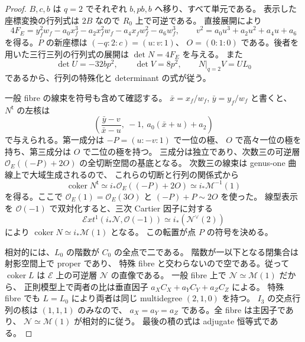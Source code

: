 \begin{proof}
$B,c,b$ は $q=2$ でそれぞれ $b,pb,b$ へ移り、すべて単元である。
表示した座標変換の行列式は $2B$ なので $R_0$ 上で可逆である。
直接展開により
\[
 4F_E=y_f^2w_f-a_0x_f^3-a_2x_f^2w_f-a_4x_fw_f^2-a_6w_f^3,
 \qquad v^2=a_0u^3+a_2u^2+a_4u+a_6
\]
を得る。$P$ の新座標は $(-q:2:c)=(u:v:1)$、
$O=(0:1:0)$ である。後者を用いた三行三列の行列式の展開は
$\det N=4F_E$ を与える。
また
\[
 \det U=-32bp^2,\qquad\det V=8p^2,\qquad
 N|_{q=2}V=UL_0
\]
であるから、行列の特殊化と determinant の式が従う。

一般 fibre の線束を符号も含めて確認する。
$\bar x=x_f/w_f$, $\bar y=y_f/w_f$ と書くと、
$N^{\mathsf t}$ の左核は
\[
 \left(\frac{\bar y-v}{\bar x-u},\ -1,\
              a_0(\bar x+u)+a_2\right)
\]
で与えられる。第一成分は $-P=(u:-v:1)$ で一位の極、
$O$ で高々一位の極を持ち、第三成分は $O$ で二位の極を持つ。
三成分は独立であり、次数三の可逆層
$\mathcal O_E((-P)+2O)$ の全切断空間の基底となる。
次数三の線束は genus-one 曲線上で大域生成されるので、
これらの切断と行列の関係式から
\[
 \operatorname{coker}N^{\mathsf t}
   \simeq i_*\mathcal O_E((-P)+2O)
   \simeq i_*\mathcal M^{-1}(1)
\]
を得る。ここで $\mathcal O_E(1)=\mathcal O_E(3O)$ と
$(-P)+P\sim2O$ を使った。
線型表示を $\mathcal O(-1)$ で双対化すると、三次 Cartier 因子に対する
\[
 \mathcal E xt^1(i_*\mathcal N,\mathcal O(-1))
       \simeq i_*(\mathcal N^\vee(2))
\]
により $\operatorname{coker}N\simeq i_*\mathcal M(1)$ となる。
この転置が点 $P$ の符号を決める。

相対的には、$L_0$ の階数が $C_0$ の全点で二である。
階数が一以下となる閉集合は射影空間上で proper であり、
特殊 fibre と交わらないので空である。従って $\operatorname{coker}L$ は
$\mathcal E$ 上の可逆層 $\mathcal N$ の直像である。
一般 fibre 上で $\mathcal N\simeq\mathcal M(1)$ だから、
正則模型上で両者の比は垂直因子
$a_XC_X+a_YC_Y+a_ZC_Z$ による。
特殊 fibre でも $L=L_0$ により両者は同じ multidegree $(2,1,0)$ を持つ。
$I_3$ の交点行列の核は $(1,1,1)$ のみなので、
$a_X=a_Y=a_Z$ である。全 fibre は主因子であり、
$\mathcal N\simeq\mathcal M(1)$ が相対的に従う。
最後の積の式は adjugate 恒等式である。
\end{proof}

